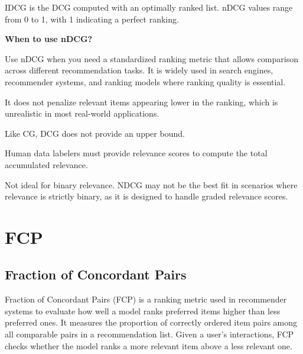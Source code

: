 IDCG is the DCG computed with an optimally ranked list. nDCG values range from 0 to 1, with 1 indicating a perfect ranking.

\textbf{When to use nDCG?}

Use nDCG when you need a standardized ranking metric that allows comparison across different recommendation tasks.
It is widely used in search engines, recommender systems, and ranking models where ranking quality is essential.

{
    \item It does not penalize relevant items appearing lower in the ranking, which is
    unrealistic in most real-world applications.
    \item Like CG, DCG does not provide an upper bound.
    \item Human data labelers must provide relevance scores to compute the total accumulated relevance.
    \item Not ideal for binary relevance. NDCG may not be the best fit in scenarios where relevance is strictly binary, as it
    is designed to handle graded relevance scores.
}



\clearpage
\thispagestyle{rankingstyle}
\section{FCP}
\subsection{Fraction of Concordant Pairs}

Fraction of Concordant Pairs (FCP) is a ranking metric used in recommender systems to evaluate how well a model ranks
preferred items higher than less preferred ones. It measures the proportion of correctly ordered item pairs among all
comparable pairs in a recommendation list. Given a user’s interactions, FCP checks whether the model ranks a more relevant
item above a less relevant one.

